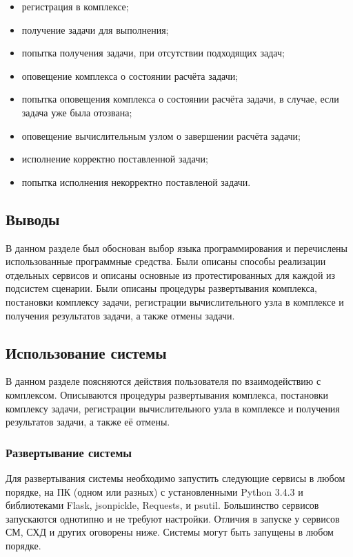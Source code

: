 \documentclass[a4paper,12pt]{report}
\numberwithin{equation}{section}
\begin{document}
  \begin{itemize}
    \item регистрация в комплексе;
    \item получение задачи для выполнения;
    \item попытка получения задачи, при отсутствии подходящих задач;
    \item оповещение комплекса о состоянии расчёта задачи;
    \item попытка оповещения комплекса о состоянии расчёта задачи, в случае, если задача уже была отозвана;
    \item оповещение вычислительным узлом о завершении расчёта задачи;
    \item исполнение корректно поставленной задачи;
    \item попытка исполнения некорректно поставленой задачи.
  \end{itemize}
  
  \subsection{Выводы}
  В данном разделе был обоснован выбор языка программирования и перечислены использованные программные средства.
  Были описаны способы реализации отдельных сервисов и описаны основные из протестированных для каждой из подсистем сценарии.
  Были описаны процедуры развертывания комплекса, постановки комплексу задачи, регистрации вычислительного узла в комплексе и получения результатов задачи, а также отмены задачи.
  
  \subsection{Использование системы}  
  
  В данном разделе поясняются действия пользователя по взаимодействию с комплексом. 
  Описываются процедуры развертывания комплекса, постановки комплексу задачи, регистрации вычислительного узла в комплексе и получения результатов задачи, а также её отмены.
  
  \subsubsection{Развертывание системы}
  Для развертывания системы необходимо запустить следующие сервисы в любом порядке, 
  на ПК (одном или разных) с установленными Python 3.4.3 и библиотеками Flask, jsonpickle, Requests, и psutil. 
  Большинство сервисов запускаются однотипно и не требуют настройки. 
  Отличия в запуске у сервисов СМ, СХД и других оговорены ниже.
  Системы могут быть запущены в любом порядке.
  
\end{document}
